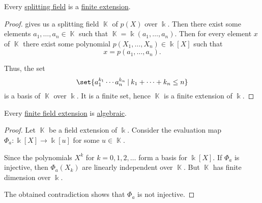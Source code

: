 \begin{proposition}\label{thm:splitting_field_is_finite_extension}
  Every \hyperref[def:splitting_field]{splitting field} is a \hyperref[def:field_extension_degree]{finite extension}.
\end{proposition}
\begin{proof}
   gives us a splitting field \( \BbbK \) of \( p(X) \) over \( \Bbbk \). Then there exist some elements \( a_1, \ldots, a_n \in \BbbK \) such that \( \BbbK = \Bbbk(a_1, \ldots, a_n) \). Then for every element \( x \) of \( \BbbK \) there exist some polynomial \( p(X_1, \ldots, X_n) \in \Bbbk[X] \) such that
  \begin{equation*}
    x = p(a_1, \ldots, a_n).
  \end{equation*}

  Thus, the set
  \begin{equation*}
    \set{ a_1^{k_1} \cdots a_n^{k_n} \given k_1 + \cdots + k_n \leq n }
  \end{equation*}
  is a basis of \( \BbbK \) over \( \Bbbk \). It is a finite set, hence \( \BbbK \) is a finite extension of \( \Bbbk \).
\end{proof}

\begin{proposition}\label{thm:finite_field_extensions_are_algebraic}
  Every \hyperref[def:field_extension_degree]{finite field extension} is \hyperref[def:transcendental_element]{algebraic}.
\end{proposition}
\begin{proof}
  Let \( \BbbK \) be a field extension of \( \Bbbk \). Consider the evaluation map \( \Phi_a: \Bbbk[X] \to \Bbbk[u] \) for some \( u \in \BbbK \).

  Since the polynomials \( X^k \) for \( k = 0, 1, 2, \ldots \) form a basis for \( \Bbbk[X] \). If \( \Phi_a \) is injective, then \( \Phi_a(X_k) \) are linearly independent over \( \BbbK \). But \( \BbbK \) has finite dimension over \( \Bbbk \).

  The obtained contradiction shows that \( \Phi_a \) is not injective.
\end{proof}

